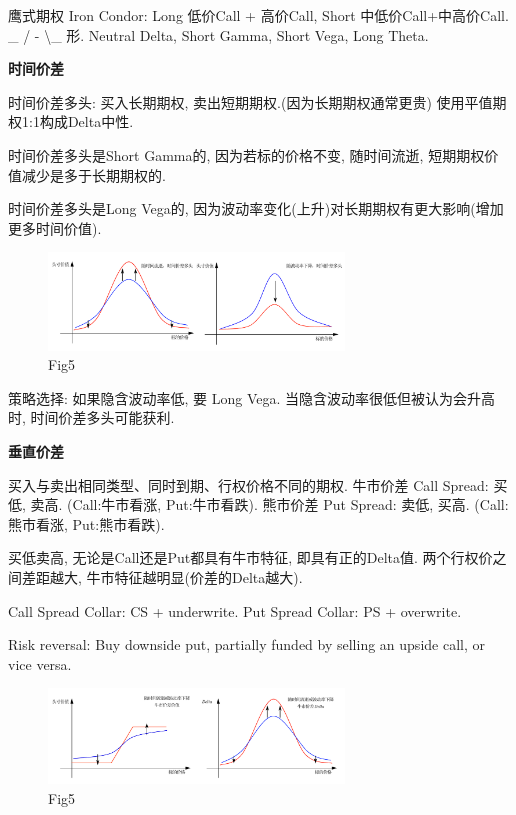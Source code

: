 \documentclass[UTF8]{ctexart}
\begin{document}
鹰式期权 Iron Condor: Long 低价Call + 高价Call, Short 中低价Call+中高价Call.
\_ / - \textbackslash \_ 形.
Neutral Delta, Short Gamma, Short Vega, Long Theta.

\noindent \textbf{时间价差} \par 
时间价差多头: 买入长期期权, 卖出短期期权.(因为长期期权通常更贵)
使用平值期权1:1构成Delta中性.

时间价差多头是Short Gamma的, 因为若标的价格不变, 随时间流逝, 短期期权价值减少是多于长期期权的.

时间价差多头是Long Vega的, 因为波动率变化(上升)对长期期权有更大影响(增加更多时间价值).

\begin{figure}[H]
    \centering
    \includegraphics[width=0.7\textwidth]{fig/fig5.png}
    \caption{Fig5}
\end{figure}

策略选择: 如果隐含波动率低, 要 Long Vega.
当隐含波动率很低但被认为会升高时, 时间价差多头可能获利.

\noindent \textbf{垂直价差} \par 
买入与卖出相同类型、同时到期、行权价格不同的期权.
牛市价差 Call Spread: 买低, 卖高. (Call:牛市看涨, Put:牛市看跌).
熊市价差 Put Spread: 卖低, 买高. (Call:熊市看涨, Put:熊市看跌).

买低卖高, 无论是Call还是Put都具有牛市特征, 即具有正的Delta值. 
两个行权价之间差距越大, 牛市特征越明显(价差的Delta越大).

Call Spread Collar: CS + underwrite.
Put Spread Collar: PS + overwrite.

Risk reversal: Buy downside put, partially funded by selling an upside call, or vice versa.

\begin{figure}[H]
    \centering
    \includegraphics[width=0.7\textwidth]{fig/fig6.png}
    \caption{Fig5}
\end{figure}
\end{document}
